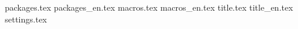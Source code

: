 {packages.tex}
{packages_en.tex}
{macros.tex}
{macros_en.tex}
{title.tex}
{title_en.tex}
{settings.tex}